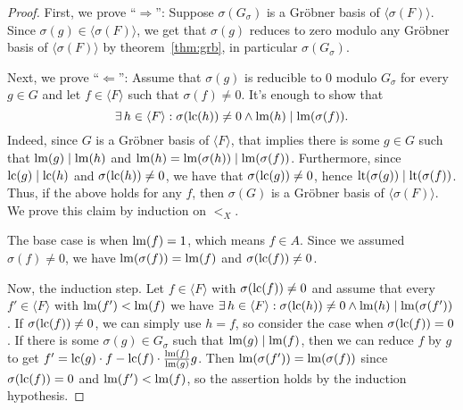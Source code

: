 \begin{proof}
  First, we prove ``$\Longrightarrow$'': Suppose $\sigma(G_{\sigma})$ is a Gröbner basis of $\langle \sigma(F) \rangle$. Since $\sigma(g) \in \langle \sigma(F) \rangle$, we get that $\sigma(g)$ reduces to zero modulo any Gröbner basis of $\langle \sigma(F) \rangle$ by theorem~\ref{thm:grb}, in particular $\sigma(G_{\sigma})$.

  Next, we prove ``$\Longleftarrow$'': Assume that $\sigma(g)$ is reducible to 0 modulo $G_{\sigma}$ for every $g \in G$ and let $f \in \langle F \rangle$ such that $\sigma(f) \neq 0$. It's enough to show that
  \[\exists\, h \in \langle F \rangle : \sigma(\operatorname{lc}(h)) \neq 0 \land \operatorname{lm}(h) \mid \operatorname{lm}(\sigma(f)).\]
  Indeed, since $G$ is a Gröbner basis of $\langle F \rangle$, that implies there is some $g \in G$ such that $\operatorname{lm}(g) \mid \operatorname{lm}(h)$ and $\operatorname{lm}(h) = \operatorname{lm}(\sigma(h)) \mid \operatorname{lm}(\sigma(f))$. Furthermore, since $\operatorname{lc}(g) \mid \operatorname{lc}(h)$ and $\sigma(\operatorname{lc}(h)) \neq 0$, we have that $\sigma(\operatorname{lc}(g)) \neq 0$, hence $\operatorname{lt}(\sigma(g)) \mid \operatorname{lt}(\sigma(f))$. Thus, if the above holds for any $f$, then $\sigma(G)$ is a Gröbner basis of $\langle \sigma(F) \rangle$. We prove this claim by induction on $<_{X}$.

  The base case is when $\operatorname{lm}(f) = 1$, which means $f \in A$. Since we assumed $\sigma(f) \neq 0$, we have $\operatorname{lm}(\sigma(f)) = \operatorname{lm}(f)$ and $\sigma(\operatorname{lc}(f)) \neq 0$.

  Now, the induction step. Let $f \in \langle F \rangle$ with $\sigma(\operatorname{lc}(f)) \neq 0$ and assume that every $f' \in \langle F \rangle$ with $\operatorname{lm}(f') < \operatorname{lm}(f)$ we have $\exists\, h \in \langle F \rangle : \sigma(\operatorname{lc}(h)) \neq 0 \land \operatorname{lm}(h) \mid \operatorname{lm}(\sigma(f'))$. If $\sigma(\operatorname{lc}(f)) \neq 0$, we can simply use $h = f$, so consider the case when $\sigma(\operatorname{lc}(f)) = 0$. If there is some $\sigma(g) \in G_{\sigma}$ such that $\operatorname{lm}(g) \mid \operatorname{lm}(f)$, then we can reduce $f$ by $g$ to get $f' = \operatorname{lc}(g) \cdot f - \operatorname{lc}(f) \cdot \frac{\operatorname{lm}(f)}{\operatorname{lm}(g)}g$. Then $\operatorname{lm}(\sigma(f')) = \operatorname{lm}(\sigma(f))$ since $\sigma(\operatorname{lc}(f)) = 0$ and $\operatorname{lm}(f') < \operatorname{lm}(f)$, so the assertion holds by the induction hypothesis.


\end{proof}
